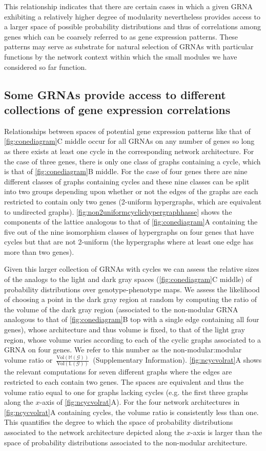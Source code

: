 This relationship indicates that there are certain cases in which a given GRNA exhibiting a relatively higher degree of modularity nevertheless provides access to a larger space of possible probability distributions and thus of correlations among genes which can be coarsely referred to as gene expression patterns. These patterns may serve as substrate for natural selection of GRNAs with particular functions by the network context within which the small modules we have considered so far function.

\subsection{Some GRNAs provide access to different collections of gene expression correlations}
Relationships between spaces of potential gene expression patterns like that of \ref{fig:conediagram}C middle occur for all GRNAs on any number of genes so long as there exists at least one cycle in the corresponding network architecture. For the case of three genes, there is only one class of graphs containing a cycle, which is that of \ref{fig:conediagram}B middle. For the case of four genes there are nine different classes of graphs containing cycles and these nine classes can be split into two groups depending upon whether or not the edges of the graphs are each restricted to contain only two genes (2-uniform hypergraphs, which are equivalent to undirected graphs). \ref{fig:non2uniformcyclichypergraphhasse} shows the components of the lattice analogous to that of \ref{fig:conediagram}A containing the five out of the nine isomorphism classes of hypergraphs on four genes that have cycles but that are not 2-uniform (the hypergraphs where at least one edge has more than two genes).

Given this larger collection of GRNAs with cycles we can assess the relative sizes of the analogs to the light and dark gray spaces (\ref{fig:conediagram}C middle) of probability distributions over genotype-phenotype maps. We assess the likelihood of choosing a point in the dark gray region at random by computing the ratio of the volume of the dark gray region (associated to the non-modular GRNA analogous to that of \ref{fig:conediagram}B top with a single edge containing all four genes), whose architecture and thus volume is fixed, to that of the light gray region, whose volume varies according to each of the cyclic graphs associated to a GRNA on four genes. We refer to this number as the non-modular:modular volume ratio or~$\frac{\text{Vol}(\mathbb{M}(\mathcal{G}))}{\text{Vol}(\mathbb{L}(\mathcal{G}))}$~(Supplementary Information). \ref{fig:ncycvolrat}A shows the relevant computations for seven different graphs where the edges are restricted to each contain two genes. The spaces are equivalent and thus the volume ratio equal to one for graphs lacking cycles (e.g. the first three graphs along the $x$-axis of \ref{fig:ncycvolrat}A). For the four network architectures in \ref{fig:ncycvolrat}A containing cycles, the volume ratio is consistently less than one. This quantifies the degree to which the space of probability distributions associated to the network architecture depicted along the $x$-axis is larger than the space of probability distributions associated to the non-modular architecture.

